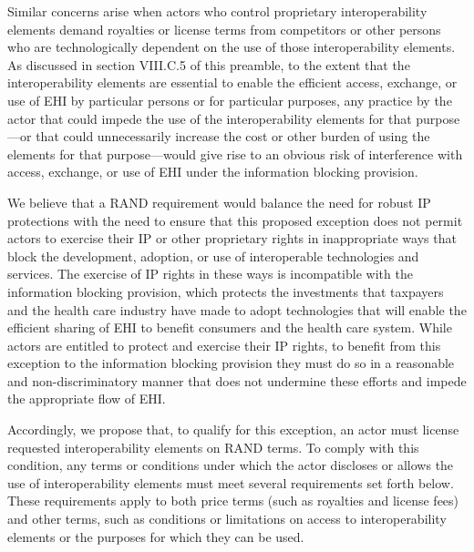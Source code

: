 \documentclass[twoside,11pt]{article}
\begin{document}




          Similar concerns arise when actors who control proprietary interoperability elements demand royalties or license terms from competitors or other persons who are technologically dependent on the use of those interoperability elements. As discussed in section VIII.C.5 of this preamble, to the extent that the interoperability elements are essential to enable the efficient access, exchange, or use of EHI by particular persons or for particular purposes, any practice by the actor that could impede the use of the interoperability elements for that purpose—or that could unnecessarily increase the cost or other burden of using the elements for that purpose—would give rise to an obvious risk of interference with access, exchange, or use of EHI under the information blocking provision.


          We believe that a RAND requirement would balance the need for robust IP protections with the need to ensure that this proposed exception does not permit actors to exercise their IP or other proprietary rights in inappropriate ways that block the development, adoption, or use of interoperable technologies and services. The exercise of IP rights in these ways is incompatible with the information blocking provision, which protects the investments that taxpayers and the health care industry have made to adopt technologies that will enable the efficient sharing of EHI  to benefit consumers and the health care system. While actors are entitled to protect and exercise their IP rights, to benefit from this exception to the information blocking provision they must do so in a reasonable and non-discriminatory manner that does not undermine these efforts and impede the appropriate flow of EHI.


          Accordingly, we propose that, to qualify for this exception, an actor must license requested interoperability elements on RAND terms. To comply with this condition, any terms or conditions under which the actor discloses or allows the use of interoperability elements must meet several requirements set forth below. These requirements apply to both price terms (such as royalties and license fees) and other terms, such as conditions or limitations on access to interoperability elements or the purposes for which they can be used.
\end{document}
